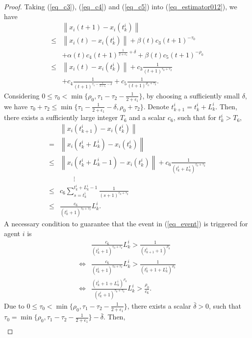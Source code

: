 \documentclass[10pt,journal,final]{IEEEtran}
\newcommand{\norm}[1]{\left\lVert#1\right\rVert}
\theoremstyle{plain}
\theoremstyle{definition}
\theoremstyle{remark}
\begin{document}
\begin{proof}
Taking (\ref{eq_c3}), (\ref{eq_c4}) and (\ref{eq_c5}) into (\ref{eq_estimator012}), we have
\begin{align}\label{eq_estimator002}
&\norm{x_{i}(t+1)-x_i(t_{k}^i)}\\
\leq&\norm{x_{i}(t)-x_i(t_{k}^i)}+\beta(t)c_3 (t+1)^{-\tau_0}\nonumber\\
&+\alpha(t) c_4(t+1)^{\frac{1}{2+\epsilon_1}+\delta}+\beta(t)c_5(t+1)^{-\rho_0}\nonumber\\
\leq &\norm{x_{i}(t)-x_i(t_{k}^i)}+c_3\frac{1}{(t+1)^{\tau_0+\tau_2}}\nonumber\\\
&+ c_4\frac{1}{(t+1)^{\tau_1-\frac{1}{2+\epsilon_1}-\delta}}+c_5\frac{1}{(t+1)^{\rho_0+\tau_2}}.
\end{align}
Considering  $	0\leq\tau_0<\min\{\rho_0,\tau_1-\tau_2-\frac{1}{2+\epsilon_1}\}$, by choosing a sufficiently small $\delta$, we have
$\tau_0+\tau_2\leq \min\{\tau_1-\frac{1}{2+\epsilon_1}-\delta,\rho_0+\tau_2\}$. 
Denote $t_{k+1}^i=t_{k}^i+L_{k}^i$.
Then, there exists a sufficiently large integer $T_6$ and a scalar $c_6$, such that for
$t_{k}^i>T_6$, 
\begin{align*}
&\norm{x_i(t_{k+1}^i)-x_i(t_{k}^i)}\\
=&\norm{x_i(t_{k}^i+L_{k}^i)-x_i(t_{k}^i)}\\
\leq&\norm{x_i(t_{k}^i+L_{k}^i-1)-x_i(t_{k}^i)}+c_6 \frac{1}{(t_{k}^i+L_{k}^i)^{\tau_0+\tau_2}}\\
&\qquad\vdots\\
\leq&c_6\sum_{s=t_{k}^i}^{t_{k}^i+L_{k}^i-1} \frac{1}{(s+1)^{\tau_0+\tau_2}}\\
\leq&\frac{c_6}{(t_{k}^i+1)^{\tau_0+\tau_2}}L_{k}^i.
\end{align*}
A necessary condition to guarantee that the event in (\ref{eq_event}) is triggered for agent $i$ is 
\begin{align}\label{eq_equli}
&\frac{c_6}{(t_{k}^i+1)^{\tau_0+\tau_2}}L_{k}^i>\frac{1}{ (t_{k+1}^i+1)^{\rho_0}}\nonumber\\
\Longleftrightarrow&\frac{c_6}{(t_{k}^i+1)^{\tau_0+\tau_2}}L_{k}^i>\frac{1}{ (t_{k}^i+1+L_{k}^i)^{\rho_0}}\nonumber\\
\Longleftrightarrow&\frac{(t_{k}^i+1+L_{k}^i)^{\rho_0}}{(t_{k}^i+1)^{\tau_0+\tau_2}}L_{k}^i>\frac{\rho_0}{c_6}.
\end{align}
Due to $0\leq\tau_0<\min\{\rho_0,\tau_1-\tau_2-\frac{1}{2+\epsilon_1}\}$, there exists a scalar $\bar\delta>0$, such that $\tau_0=\min\{\rho_0,\tau_1-\tau_2-\frac{1}{2+\epsilon_1}\}-\bar\delta$.
Then, 
\begin{align*}

\end{align*}
\end{proof}
\end{document}
